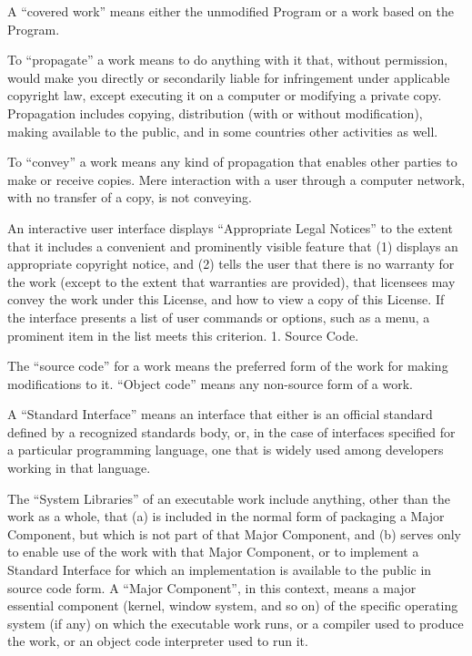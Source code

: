 {\begin{multicols}{4}
A “covered work” means either the unmodified Program or a work based on the Program.

To “propagate” a work means to do anything with it that, without permission, would make you directly or secondarily liable for infringement under applicable copyright law, except executing it on a computer or modifying a private copy. Propagation includes copying, distribution (with or without modification), making available to the public, and in some countries other activities as well.

To “convey” a work means any kind of propagation that enables other parties to make or receive copies. Mere interaction with a user through a computer network, with no transfer of a copy, is not conveying.

An interactive user interface displays “Appropriate Legal Notices” to the extent that it includes a convenient and prominently visible feature that (1) displays an appropriate copyright notice, and (2) tells the user that there is no warranty for the work (except to the extent that warranties are provided), that licensees may convey the work under this License, and how to view a copy of this License. If the interface presents a list of user commands or options, such as a menu, a prominent item in the list meets this criterion.
1. Source Code.

The “source code” for a work means the preferred form of the work for making modifications to it. “Object code” means any non-source form of a work.

A “Standard Interface” means an interface that either is an official standard defined by a recognized standards body, or, in the case of interfaces specified for a particular programming language, one that is widely used among developers working in that language.

The “System Libraries” of an executable work include anything, other than the work as a whole, that (a) is included in the normal form of packaging a Major Component, but which is not part of that Major Component, and (b) serves only to enable use of the work with that Major Component, or to implement a Standard Interface for which an implementation is available to the public in source code form. A “Major Component”, in this context, means a major essential component (kernel, window system, and so on) of the specific operating system (if any) on which the executable work runs, or a compiler used to produce the work, or an object code interpreter used to run it.


\end{multicols}}
